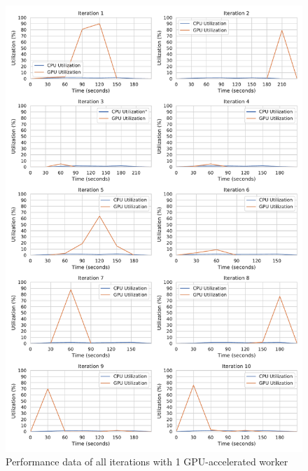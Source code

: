 \begin{figure}[h]
\centering
\includegraphics[scale=0.4]{images/07_evaluation/regression/gpu1_performance}
\caption{Performance data of all iterations with 1 GPU-accelerated worker}
\label{fig:appendix_eval_regression_gpu1}
\end{figure}


